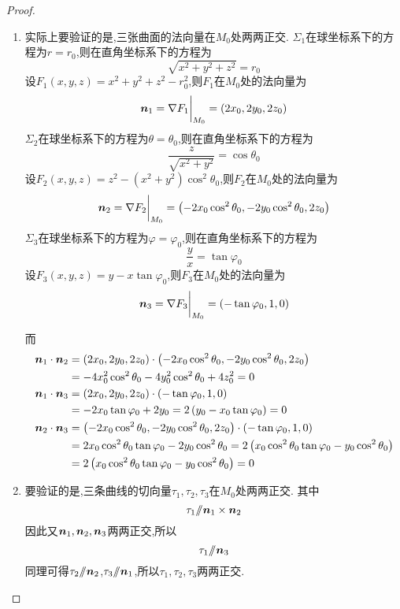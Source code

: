 \begin{proof}
    \begin{enumerate}
        \item 实际上要验证的是,三张曲面的法向量在$M_0$处两两正交.
        $\Sigma_1$在球坐标系下的方程为$r = r_0$,则在直角坐标系下的方程为
        $$\sqrt{x^2 + y^2 + z^2} = r_0$$
        设$F_1(x,y,z) = x^2 + y^2 + z^2 - r_0^2$,则$F_1$在$M_0$处的法向量为
        $$\bm{n}_1 = \nabla F_1 \bigg|_{M_0} = \left( 2x_0, 2y_0, 2z_0 \right)$$
        $\Sigma_2$在球坐标系下的方程为$\theta = \theta_0$,则在直角坐标系下的方程为
        $$\frac{z}{\sqrt{x^2+y^2}} = \cos \theta_0$$
        设$F_2(x,y,z) = z^2 - (x^2 + y^2) \cos^2 \theta_0$,则$F_2$在$M_0$处的法向量为
        $$\bm{n}_2 = \nabla F_2 \bigg|_{M_0} = \left( -2x_0 \cos^2 \theta_0, -2y_0 \cos^2 \theta_0, 2z_0 \right)$$
        $\Sigma_3$在球坐标系下的方程为$\varphi = \varphi_0$,则在直角坐标系下的方程为
        $$\frac{y}{x} = \tan \varphi_0$$
        设$F_3(x,y,z) = y - x \tan \varphi_0$,则$F_3$在$M_0$处的法向量为
        $$\bm{n}_3 = \nabla F_3 \bigg|_{M_0} = \left( -\tan \varphi_0, 1, 0 \right)$$

        而
        \begin{align*}
            \bm{n}_1 \cdot \bm{n}_2 &= \left( 2x_0, 2y_0, 2z_0 \right) \cdot \left( -2x_0 \cos^2 \theta_0, -2y_0 \cos^2 \theta_0, 2z_0 \right)\\
            &= -4x_0^2 \cos^2 \theta_0 - 4y_0^2 \cos^2 \theta_0 + 4z_0^2 = 0\\
            \bm{n}_1 \cdot \bm{n}_3 &= \left( 2x_0, 2y_0, 2z_0 \right) \cdot \left( -\tan \varphi_0, 1, 0 \right)\\
            &= -2x_0 \tan \varphi_0 + 2y_0 = 2\left( y_0 - x_0 \tan \varphi_0 \right) = 0\\
            \bm{n}_2 \cdot \bm{n}_3 &= \left( -2x_0 \cos^2 \theta_0, -2y_0 \cos^2 \theta_0, 2z_0 \right) \cdot \left( -\tan \varphi_0, 1, 0 \right)\\
            &= 2x_0 \cos^2 \theta_0 \tan \varphi_0 - 2y_0 \cos^2 \theta_0 = 2\left( x_0 \cos^2 \theta_0 \tan \varphi_0 - y_0 \cos^2 \theta_0 \right)\\
            &= 2\left( x_0 \cos^2 \theta_0 \tan \varphi_0 - y_0 \cos^2 \theta_0 \right) = 0
        \end{align*}
        \item 要验证的是,三条曲线的切向量$\tau_1,\tau_2,\tau_3$在$M_0$处两两正交.
        其中$$\tau_1 /\!\!/ \bm{n}_1 \times \bm{n}_2$$
        因此又$\bm{n}_1,\bm{n}_2,\bm{n}_3$两两正交,所以
        $$\tau_1 /\!\!/ \bm{n}_3$$
        同理可得$\tau_2 /\!\!/ \bm{n}_2$,$\tau_3 /\!\!/ \bm{n}_1$,所以$\tau_1,\tau_2,\tau_3$两两正交.
    \end{enumerate}
\end{proof}

